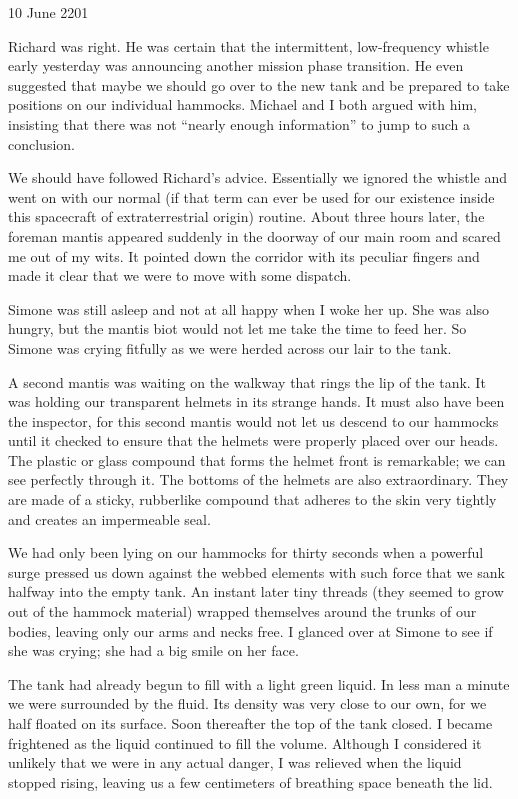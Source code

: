 \documentclass[]{article}
\begin{document}
10 June 2201

Richard was right.  He was certain that the intermittent, low-frequency whistle early yesterday was announcing another mission phase transition.  He even suggested that maybe we should go over to the new tank and be prepared to take positions on our individual hammocks.  Michael and I both argued with him, insisting that there was not “nearly enough information” to jump to such a conclusion.

We should have followed Richard’s advice.  Essentially we ignored the whistle and went on with our normal (if that term can ever be used for our existence inside this spacecraft of extraterrestrial origin) routine.  About three hours later, the foreman mantis appeared suddenly in the doorway of our main room and scared me out of my wits.  It pointed down the corridor with its peculiar fingers and made it clear that we were to move with some dispatch.

Simone was still asleep and not at all happy when I woke her up.  She was also hungry, but the mantis biot would not let me take the time to feed her.  So Simone was crying fitfully as we were herded across our lair to the tank.

A second mantis was waiting on the walkway that rings the lip of the tank.  It was holding our transparent helmets in its strange hands.  It must also have been the inspector, for this second mantis would not let us descend to our hammocks until it checked to ensure that the helmets were properly placed over our heads.  The plastic or glass compound that forms the helmet front is remarkable; we can see perfectly through it.  The bottoms of the helmets are also extraordinary.  They are made of a sticky, rubberlike compound that adheres to the skin very tightly and creates an impermeable seal.

We had only been lying on our hammocks for thirty seconds when a powerful surge pressed us down against the webbed elements with such force that we sank halfway into the empty tank.  An instant later tiny threads (they seemed to grow out of the hammock material) wrapped themselves around the trunks of our bodies, leaving only our arms and necks free.  I glanced over at Simone to see if she was crying; she had a big smile on her face.

The tank had already begun to fill with a light green liquid.  In less man a minute we were surrounded by the fluid.  Its density was very close to our own, for we half floated on its surface.  Soon thereafter the top of the tank closed.  I became frightened as the liquid continued to fill the volume.  Although I considered it unlikely that we were in any actual danger, I was relieved when the liquid stopped rising, leaving us a few centimeters of breathing space beneath the lid.
\end{document}
